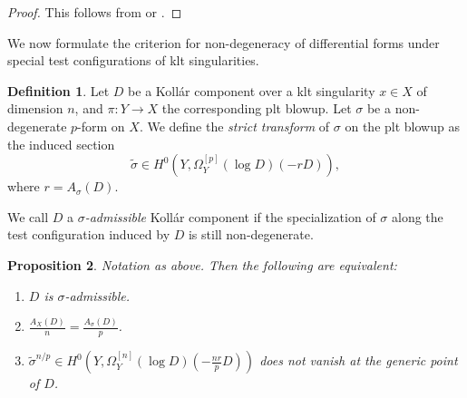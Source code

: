 \documentclass[12pt]{amsart}
\newtheorem{prop}{Proposition}[section]
\theoremstyle{definition}
\newtheorem{defn}[prop]{Definition}
\newcommand{\cY}{\mathcal{Y}}
\newcommand{\cE}{\mathcal{E}}
\numberwithin{equation}{section}
\begin{document}
\begin{proof}
This follows from \cite[Theorem 1.4]{GKKP-extend-forms} or \cite[Corollary 1.7]{KS-extend-forms}.
\end{proof}

We now formulate the criterion for non-degeneracy of differential forms under special test configurations of klt singularities.

\begin{defn} \label{def:sigma-admissible}
Let $D$ be a Koll\'ar component over a klt singularity $x\in X$ of dimension $n$, and $\pi\colon Y\to X$ the corresponding plt blowup.  Let $\sigma$ be a non-degenerate $p$-form on $X$. We define the \emph{strict transform} of $\sigma$ on the plt blowup as the induced section
\[
\tilde{\sigma}\in H^0(Y,\Omega^{[p]}_{Y}(\log D)(-rD)),
\]
where $r=A_{\sigma}(D)$. 

We call $D$ a \emph{$\sigma$-admissible} Koll\'ar component  if the specialization of $\sigma$ along the test configuration induced by $D$ is still non-degenerate.
\end{defn}

\begin{prop} \label{prop:non-degenerate criterion}
Notation as above. Then the following are equivalent:
\begin{enumerate}
    \item $D$ is $\sigma$-admissible.
    \item $\frac{A_X(D)}{n} = \frac{A_{\sigma}(D)}{p} $.
    \item $\tilde{\sigma}^{n/p} \in H^0(Y,\Omega^{[n]}_{Y}(\log D)(-\frac{nr}{p}D))$ does not vanish at the generic point of $D$. %
\end{enumerate}
\end{prop}
\end{document}
